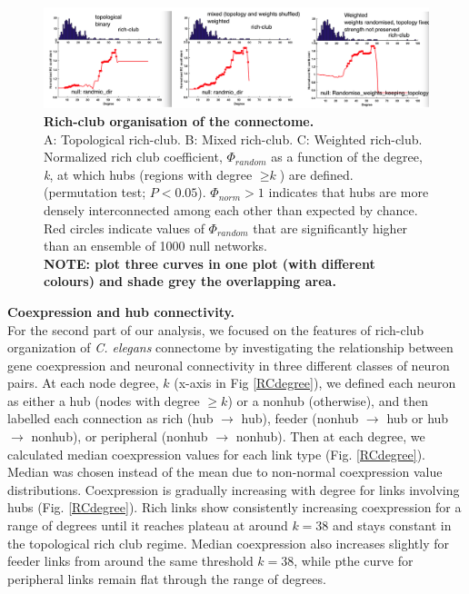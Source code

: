 \documentclass[10pt,letterpaper]{article}
\begin{document}
\begin{figure}[!h]
   \centering
    \includegraphics[width=1\textwidth]{RCcurveFINAL3}
 \caption{{\bf Rich-club organisation of the connectome.} \\
A: Topological rich-club. B: Mixed rich-club. C: Weighted rich-club. \\
Normalized rich club coefficient, $\Phi_{random}$ as a function of the degree, \textit{k}, at which hubs (regions with degree $\geq \textit{k}$) are defined. (permutation test; $P<0.05$).
$\Phi_{norm}>1$ indicates that hubs are more densely interconnected among each other than expected by chance.
Red circles indicate values of $\Phi_{random}$ that are significantly higher than an ensemble of 1000 null networks.\\
\textbf{NOTE: plot three curves in one plot (with different colours) and shade grey the overlapping area. } }
 \label{RCcoef}
 \end{figure}


\textbf{Coexpression and hub connectivity.}\\
For the second part of our analysis, we focused on the features of rich-club organization of \textit{C. elegans} connectome by investigating the relationship between gene coexpression and neuronal connectivity in three different classes of neuron pairs.
At each node degree, $k$ (x-axis in Fig \ref{RCdegree}), we defined each neuron as either a hub (nodes with degree $\geq k$) or a nonhub (otherwise), and then labelled each connection as rich (hub $\rightarrow$ hub), feeder (nonhub $\rightarrow$ hub or hub $\rightarrow$ nonhub), or peripheral (nonhub $\rightarrow$ nonhub).
Then at each degree, we calculated median coexpression values for each link type (Fig. \ref{RCdegree}).
Median was chosen instead of the mean due to non-normal coexpression value distributions.
Coexpression is gradually increasing with degree for links involving hubs (Fig. \ref{RCdegree}).
Rich links show consistently increasing coexpression for a range of degrees until it reaches plateau at around $k=38$ and stays constant in the topological rich club regime.
Median coexpression also increases slightly for feeder links from around the same threshold $k=38$, while pthe curve for peripheral links remain flat through the range of degrees.
\end{document}
